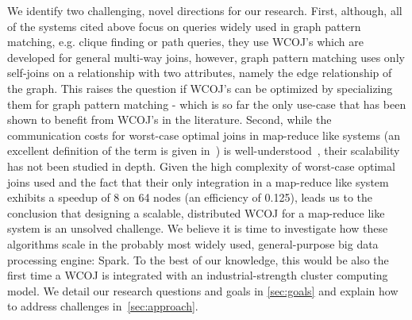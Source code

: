 We identify two challenging, novel directions for our research.
First, although, all of the systems cited above focus on queries widely used in graph pattern matching, e.g. clique finding or path queries, they use WCOJ's which are developed for general multi-way joins, however, graph pattern matching uses only self-joins on a relationship with two attributes, namely the edge relationship of the graph. 
This raises the question if WCOJ's can be optimized by specializing them for graph pattern matching - which is so far the only use-case that has been shown to benefit from WCOJ's in the literature.
Second, while the communication costs for worst-case optimal joins in map-reduce like systems (an excellent definition of the term is given in~\cite{hypercube}) is well-understood~\cite{hypercube,myria-detailed}, their scalability has not been studied in depth.
Given the high complexity of worst-case optimal joins used and the fact that their only integration in a map-reduce like system~\cite{myria-detailed} exhibits a speedup of 8 on 64 nodes (an efficiency of 0.125), leads us to the conclusion that designing a scalable, distributed WCOJ for a map-reduce like system is an unsolved challenge.
We believe it is time to investigate how these algorithms scale in the probably most widely used, general-purpose big data processing engine: Spark.
To the best of our knowledge, this would be also the first time a WCOJ is integrated with an industrial-strength cluster computing model.
We detail our research questions and goals in \cref{sec:goals} and explain how to address challenges in~\cref{sec:approach}.




